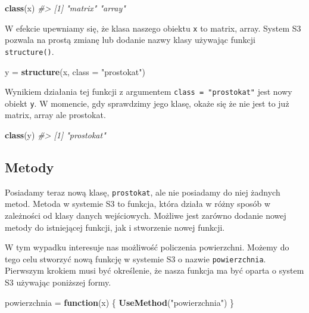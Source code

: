 \documentclass[paper=6in:9in,pagesize=pdftex,headinclude=on,footinclude=on,10pt]{scrbook}
\newenvironment{Shaded}{\begin{snugshade}}{\end{snugshade}}
\newcommand{\CommentTok}[1]{\textcolor[rgb]{0.56,0.35,0.01}{\textit{#1}}}
\newcommand{\ControlFlowTok}[1]{\textcolor[rgb]{0.13,0.29,0.53}{\textbf{#1}}}
\newcommand{\DataTypeTok}[1]{\textcolor[rgb]{0.13,0.29,0.53}{#1}}
\newcommand{\KeywordTok}[1]{\textcolor[rgb]{0.13,0.29,0.53}{\textbf{#1}}}
\newcommand{\NormalTok}[1]{#1}
\newcommand{\StringTok}[1]{\textcolor[rgb]{0.31,0.60,0.02}{#1}}
\begin{document}
\begin{Shaded}
\begin{Highlighting}[]
\KeywordTok{class}\NormalTok{(x)}
\CommentTok{#> [1] "matrix" "array"}
\end{Highlighting}
\end{Shaded}

W efekcie upewniamy się, że klasa naszego obiektu \texttt{x} to matrix, array.
System S3 pozwala na prostą zmianę lub dodanie nazwy klasy używając funkcji \texttt{structure()}.

\begin{Shaded}
\begin{Highlighting}[]
\NormalTok{y =}\StringTok{ }\KeywordTok{structure}\NormalTok{(x, }\DataTypeTok{class =} \StringTok{"prostokat"}\NormalTok{)}
\end{Highlighting}
\end{Shaded}

Wynikiem działania tej funkcji z argumentem \texttt{class\ =\ "prostokat"} jest nowy obiekt \texttt{y}.
W momencie, gdy sprawdzimy jego klasę, okaże się że nie jest to już matrix, array ale prostokat.

\begin{Shaded}
\begin{Highlighting}[]
\KeywordTok{class}\NormalTok{(y)}
\CommentTok{#> [1] "prostokat"}
\end{Highlighting}
\end{Shaded}

\hypertarget{metody}{%
\subsection{Metody}\label{metody}}

Posiadamy teraz nową klasę, \texttt{prostokat}, ale nie posiadamy do niej żadnych metod.
Metoda w systemie S3 to funkcja, która działa w różny sposób w zależności od klasy danych wejściowych.
Możliwe jest zarówno dodanie nowej metody do istniejącej funkcji, jak i stworzenie nowej funkcji.

W tym wypadku interesuje nas możliwość policzenia powierzchni.
Możemy do tego celu stworzyć nową funkcję w systemie S3 o nazwie \texttt{powierzchnia}.
Pierwszym krokiem musi być określenie, że nasza funkcja ma być oparta o system S3 używając poniższej formy.

\begin{Shaded}
\begin{Highlighting}[]
\NormalTok{powierzchnia =}\StringTok{ }\ControlFlowTok{function}\NormalTok{(x) \{}
  \KeywordTok{UseMethod}\NormalTok{(}\StringTok{"powierzchnia"}\NormalTok{)}
\NormalTok{\}}
\end{Highlighting}
\end{Shaded}
\end{document}
